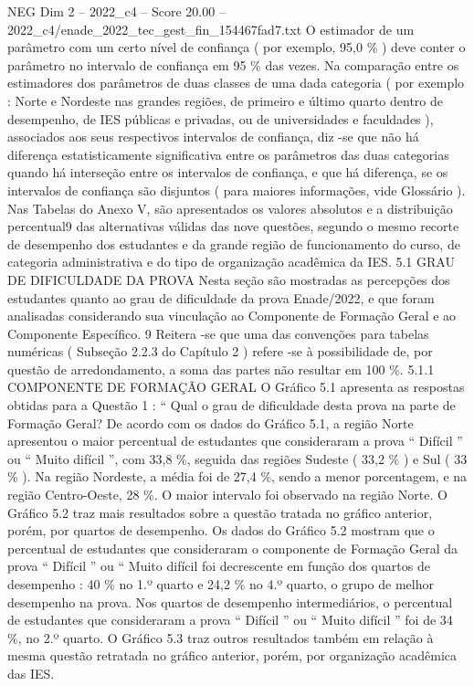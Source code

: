 \begin{textsample}{NEG Dim 2 – 2022\_c4 – Score 20.00 – 2022\_c4/enade\_2022\_tec\_gest\_fin\_154467fad7.txt}
O estimador de um parâmetro com um certo nível de confiança ( por exemplo, 95,0 \% ) deve conter o parâmetro no intervalo de confiança em 95 \% das vezes.
Na comparação entre os estimadores dos parâmetros de duas classes de uma dada categoria ( por exemplo : Norte e Nordeste nas grandes regiões, de primeiro e último quarto dentro de desempenho, de IES públicas e privadas, ou de universidades e faculdades ), associados aos seus respectivos intervalos de confiança, diz -se que não há diferença estatisticamente significativa entre os parâmetros das duas categorias quando há interseção entre os intervalos de confiança, e que há diferença, se os intervalos de confiança são disjuntos ( para maiores informações, vide Glossário ).
Nas Tabelas do Anexo V, são apresentados os valores absolutos e a distribuição percentual9 das alternativas válidas das nove questões, segundo o mesmo recorte de desempenho dos estudantes e da grande região de funcionamento do curso, de categoria administrativa e do tipo de organização acadêmica da IES. 5.1 GRAU DE DIFICULDADE DA PROVA Nesta seção são mostradas as percepções dos estudantes quanto ao grau de dificuldade da prova Enade/2022, e que foram analisadas considerando sua vinculação ao Componente de Formação Geral e ao Componente Específico. 9 Reitera -se que uma das convenções para tabelas numéricas ( Subseção 2.2.3 do Capítulo 2 ) refere -se à possibilidade de, por questão de arredondamento, a soma das partes não resultar em 100 \%. 5.1.1 COMPONENTE DE FORMAÇÃO GERAL O Gráfico 5.1 apresenta as respostas obtidas para a Questão 1 : “ Qual o grau de dificuldade desta prova na parte de Formação Geral?
De acordo com os dados do Gráfico 5.1, a região Norte apresentou o maior percentual de estudantes que consideraram a prova “ Difícil ” ou “ Muito difícil ”, com 33,8 \%, seguida das regiões Sudeste ( 33,2 \% ) e Sul ( 33 \% ).
Na região Nordeste, a média foi de 27,4 \%, sendo a menor porcentagem, e na região Centro-Oeste, 28 \%.
O maior intervalo foi observado na região Norte.
O Gráfico 5.2 traz mais resultados sobre a questão tratada no gráfico anterior, porém, por quartos de desempenho.
Os dados do Gráfico 5.2 mostram que o percentual de estudantes que consideraram o componente de Formação Geral da prova “ Difícil ” ou “ Muito difícil foi decrescente em função dos quartos de desempenho : 40 \% no 1.º quarto e 24,2 \% no 4.º quarto, o grupo de melhor desempenho na prova.
Nos quartos de desempenho intermediários, o percentual de estudantes que consideraram a prova “ Difícil ” ou “ Muito difícil ” foi de 34 \%, no 2.º quarto.
O Gráfico 5.3 traz outros resultados também em relação à mesma questão retratada no gráfico anterior, porém, por organização acadêmica das IES.

\end{textsample}
